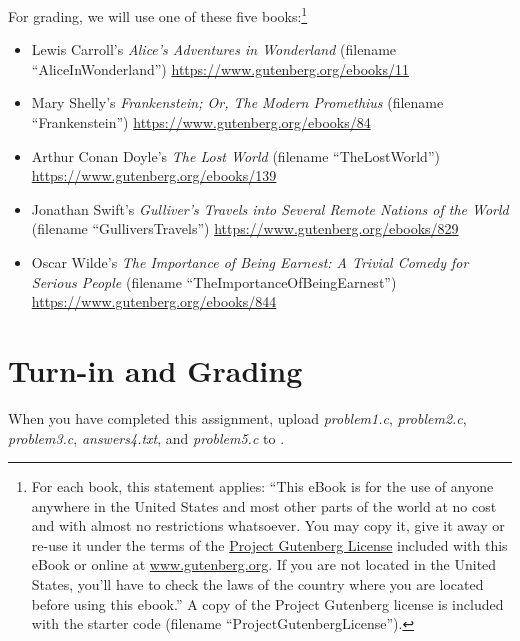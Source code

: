 For grading, we will use one of these five books:\footnote{For each book, this
statement applies: ``This eBook is for the use of anyone anywhere in the United
States and most other parts of the world at no cost and with almost no
restrictions whatsoever. You may copy it, give it away or re-use it under the
terms of the \href{http://www.gutenberg.org/policy/license}{Project Gutenberg
License} included with this eBook or online at \url{www.gutenberg.org}. If you
are not located in the United States, you'll have to check the laws of the
country where you are located before using this ebook.'' A copy of the Project
Gutenberg license is included with the starter code (filename
``ProjectGutenbergLicense'').}
\begin{itemize}
\item Lewis Carroll's \textit{Alice's Adventures in Wonderland} (filename
    ``AliceInWonderland'') \url{https://www.gutenberg.org/ebooks/11}
\item Mary Shelly's \textit{Frankenstein; Or, The Modern Promethius} (filename
    ``Frankenstein'') \url{https://www.gutenberg.org/ebooks/84}
\item Arthur Conan Doyle's \textit{The Lost World} (filename ``TheLostWorld'')
    \url{https://www.gutenberg.org/ebooks/139}
\item Jonathan Swift's \textit{Gulliver's Travels into Several Remote Nations
    of the World} (filename ``GulliversTravels'')
    \url{https://www.gutenberg.org/ebooks/829}
\item Oscar Wilde's \textit{The Importance of Being Earnest: A Trivial Comedy
    for Serious People} (filename ``TheImportanceOfBeingEarnest'')
    \url{https://www.gutenberg.org/ebooks/844}
\end{itemize}

\section*{Turn-in and Grading}

When you have completed this assignment, upload \textit{problem1.c},
\textit{problem2.c}, \textit{problem3.c}, \textit{answers4.txt}, and
\textit{problem5.c} to \filesubmission.

